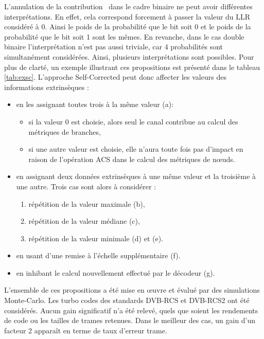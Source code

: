 \og L'annulation de la contribution \fg ~dans le cadre binaire ne peut avoir différentes interprétations. En effet, cela 
correspond forcement à passer la valeur du LLR considéré à 0. Ainsi le poids de la probabilité que le bit soit 0 et 
le poids de la probabilité que le bit soit 1 sont les mêmes. En revanche, dans le cas double binaire l'interprétation n'est 
pas aussi triviale, car 4 probabilités sont simultanément considérées. Ainsi, plusieurs interprétations sont possibles. Pour plus 
de clarté, un exemple illustrant ces propositions est présenté dans le tableau \ref{tab:exsc}. L'approche Self-Corrected 
peut donc affecter les valeurs des informations extrinsèques : 
\begin{itemize}
	\item en les assignant toutes trois à la même valeur (a):
	\begin{itemize}
		\item si la valeur 0 est choisie, alors seul le canal contribue au calcul des métriques de branches,
		\item si une autre valeur est choisie, elle n'aura toute fois pas d'impact en raison de l’opération 
		ACS dans le calcul des métriques de nœuds.
	\end{itemize}
	\item en assignant deux données extrinsèques à une même valeur et la troisième à une autre. Trois cas sont alors à considérer :
	\begin{enumerate}
		\item répétition de la valeur maximale (b),
		\item répétition de la valeur médiane (c),
		\item répétition de la valeur minimale (d) et (e).
	\end{enumerate}
	\item en usant d'une remise à l'échelle supplémentaire (f).
	\item en inhibant le calcul nouvellement effectué par le décodeur (g).\\
\end{itemize}

L'ensemble de ces propositions a été mise en œuvre et évalué par des simulations Monte-Carlo. Les turbo codes des standards 
DVB-RCS et DVB-RCS2 ont été considérés. Aucun gain significatif n'a été relevé, quels que soient les rendements de code ou les tailles de 
trames retenues. Dans le meilleur des cas, un gain d'un facteur 2 apparaît en terme de taux d'erreur trame. 

